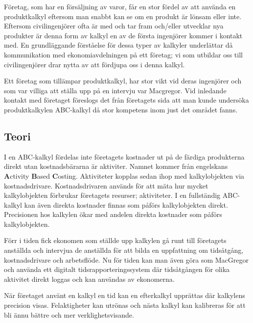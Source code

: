 Företag, som har en försäljning av varor, får en stor fördel av att använda en produktkalkyl eftersom man snabbt kan se om en produkt är lönsam eller inte.
Eftersom civilingenjörer ofta är med och tar fram och/eller utvecklar nya produkter är denna form av kalkyl en av de första ingenjörer kommer i kontakt med.
En grundläggande förståelse för dessa typer av kalkyler underlättar då kommunikation med ekonomiavdelningen på ett företag; vi som utbildar oss till civilingenjörer drar nytta av att fördjupa oss i denna kalkyl. 

Ett företag som tillämpar produktkalkyl, har stor vikt vid deras ingenjörer och som var villiga att ställa upp på en intervju var Macgregor. 
Vid inledande kontakt med företaget föreslogs det från företagets sida att man kunde undersöka produktkalkylen ABC-kalkyl då stor kompetens inom just det området fanns.


\subsection{Teori} %


I en ABC-kalkyl fördelas inte företagets kostnader ut på de färdiga produkterna direkt utan kostnadsbärarna är aktiviter.
Namnet kommer från engelskans {\bf A}ctivity {\bf B}ased {\bf C}osting.
Aktiviteter kopplas sedan ihop med kalkylobjekten via kostnadsdrivare.
Kostnadsdrivaren används för att mäta hur mycket kalkylobjekten förbrukar företagets resurser; aktiviteter.
I en fullständig ABC-kalkyl kan även direkta kostnader finnas som påförs kalkylobjekten direkt.
Precisionen hos kalkylen ökar med andelen direkta kostnader som påförs kalkylobjekten.\cite{dne}

Förr i tiden fick ekonomen som ställde upp kalkylen gå runt till företagets anställda och intervjua de anställda för att bilda en uppfattning om tidsåtgång, kostnadsdrivare och arbetsflöde. Nu för tiden kan man även göra som MacGregor och använda ett digitalt tidsrapporteringssystem där tidsåtgången för olika aktivitet direkt loggas och kan användas av ekonomerna\cite{daniel}.

När företaget använt en kalkyl en tid kan en efterkalkyl upprättas där kalkylens precision visas. Felaktigheter kan utrönas och nästa kalkyl kan kalibreras för att bli ännu bättre och mer verklighetsvisande.




